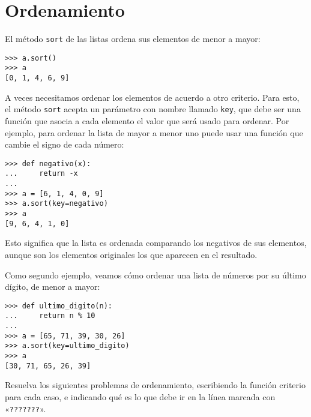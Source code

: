 \section{Ordenamiento}

El método \lstinline!sort! de las listas ordena sus elementos de menor a
mayor:
\begin{lstlisting}
>>> a.sort()
>>> a
[0, 1, 4, 6, 9]
\end{lstlisting}

A veces necesitamos ordenar los elementos de acuerdo a otro criterio.
Para esto, el método \lstinline!sort! acepta un parámetro con nombre
llamado \lstinline!key!, que debe ser una función que asocia a cada
elemento el valor que será usado para ordenar.
Por ejemplo, para ordenar la lista de mayor a menor uno puede usar una
función que cambie el signo de cada número:
\begin{lstlisting}
>>> def negativo(x):
...     return -x
...
>>> a = [6, 1, 4, 0, 9]
>>> a.sort(key=negativo)
>>> a
[9, 6, 4, 1, 0]
\end{lstlisting}

Esto significa que la lista es ordenada comparando los negativos de sus
elementos, aunque son los elementos originales los que aparecen en el
resultado.

Como segundo ejemplo, veamos cómo ordenar una lista de números por su
último dígito, de menor a mayor:

\begin{lstlisting}
>>> def ultimo_digito(n):
...     return n % 10
...
>>> a = [65, 71, 39, 30, 26]
>>> a.sort(key=ultimo_digito)
>>> a
[30, 71, 65, 26, 39]
\end{lstlisting}

Resuelva los siguientes problemas de ordenamiento, escribiendo la
función criterio para cada caso, e indicando qué es lo que debe ir en la
línea marcada con «\lstinline!???????!».

